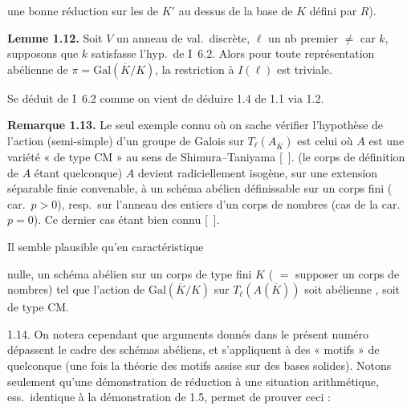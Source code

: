 \documentclass[11pt,a4paper]{article}
\begin{document}
 une bonne réduction sur les   de $K'$ au dessus de la base de $K$ défini par $R$). \ill{}

\textbf{Lemme 1.12.} Soit $V$ un anneau de val.\ discrète,   $\ell$ un nb premier $\neq$ car $k$, supposons  que $k$ satisfasse l'hyp.\ de I~6.2. Alors pour toute représentation   abélienne de $\pi = \mathrm{Gal}(\overline{K}/K)$, la restriction à $I(\ell)$ est  triviale.

Se déduit de I~6.2 comme \struck{\ill{}} on vient de déduire  1.4 de 1.1 via 1.2.

\textbf{Remarque 1.13.} Le seul exemple connu où on sache vérifier l'hypothèse \struck{\ill{}} de l'action   (semi-simple) d'un groupe de Galois sur $T_\ell(A_{\overline{K}})$ est celui où $A$ est une variété « de type CM » au sens de Shimura--Taniyama [~].   (le corps de définition de $A$ étant quelconque) $A$ devient radiciellement isogène, sur une extension  séparable finie convenable, à un schéma abélien définissable sur un corps fini ( car.~$p>0$), resp.\ sur l'anneau des entiers d'un corps de nombres (cas de la car.~$p=0$). Ce dernier cas  étant bien connu [~].

Il semble plausible qu'en caractéristique

nulle, \struck{\ill{}} un schéma abélien sur un corps de type fini $K$ ( $=$ supposer un corps de nombres) tel que l'action de $\mathrm{Gal}(\overline{K}/K)$ sur $T_\ell(A(\overline{K}))$ soit  abélienne , soit de type CM.

1.14. On notera cependant que   arguments donnés dans le présent numéro dépassent le cadre des schémas abéliens, et s'appliquent \struck{\ill{}} \add{\ill{}} à des « motifs » de   quelconque (une fois la théorie des motifs assise sur des bases solides). Notons seulement qu'une démonstration de réduction à une situation arithmétique, ess.\ identique à la démonstration de 1.5, permet de prouver ceci :
\end{document}
